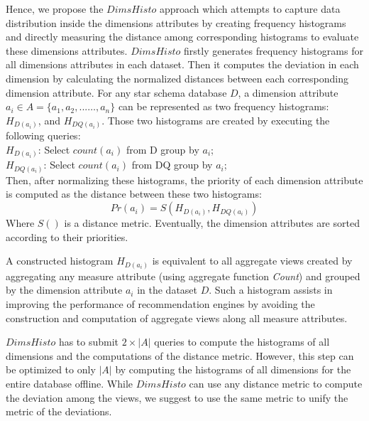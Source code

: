 %
Hence, we propose the $DimsHisto$ approach which attempts to capture data distribution inside the dimensions attributes by creating frequency histograms and directly measuring the distance among corresponding histograms to evaluate these dimensions attributes.
%
$DimsHisto$ firstly generates frequency histograms for all dimensions attributes in each dataset. 
%
Then it computes the deviation in each dimension by calculating the normalized distances between each corresponding dimension attribute.
%
For any star schema database $D$, a dimension attribute $a_i \in A =\{a_1, a_2, ... , a_n\}$ can be represented as two frequency histograms: $H_{D(a_i)}$, and $H_{DQ(a_i)}$.
%
Those two histograms are created by executing the following queries:
\\$H_{D(a_i)}$: Select $count(a_i)$ from D group by $a_i$;\\
$H_{DQ(a_i)}$: Select $count(a_i)$ from DQ group by $a_i$;\\
%
Then, after normalizing these histograms, the priority of each dimension attribute is computed as the distance between these two histograms:
\begin{equation}
\label{eq:pro_hist}
Pr(a_i)= S( H_{D(a_i)}, H_{DQ(a_i)} )
\end{equation}
%
Where $S()$ is a distance metric. 
%
Eventually, the dimension attributes are sorted according to their priorities.

%
A constructed histogram $H_{D(a_i)}$ is equivalent to all aggregate views created by aggregating any measure attribute (using aggregate function \emph{Count}) and grouped by the dimension attribute $a_i$ in the dataset $D$.
%
Such a histogram assists in improving the performance of recommendation engines by avoiding the construction and computation of aggregate views along all measure attributes.

%
$DimsHisto$ has to submit $2 \times |A|$ queries to compute the histograms of all dimensions 
and the computations of the distance metric.
%
However, this step can be optimized to only $|A|$ by computing the histograms of all dimensions for the entire database offline.
%
While $DimsHisto$ can use any distance metric to compute the deviation among the views, we suggest to use the same metric to unify the metric of the deviations.
% 

